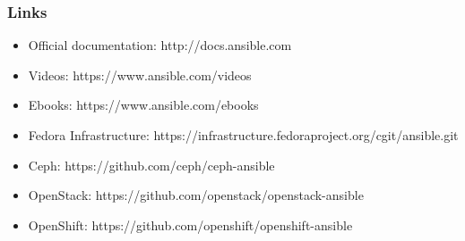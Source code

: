 \documentclass[t,aspectratio=169]{beamer}
\begin{document}
\begin{frame}
    \frametitle{Links}
    \begin{itemize}
        \item Official documentation: http://docs.ansible.com
        \item Videos: https://www.ansible.com/videos
        \item Ebooks: https://www.ansible.com/ebooks
        \item Fedora Infrastructure: https://infrastructure.fedoraproject.org/cgit/ansible.git
        \item Ceph: https://github.com/ceph/ceph-ansible
        \item OpenStack: https://github.com/openstack/openstack-ansible
        \item OpenShift: https://github.com/openshift/openshift-ansible
    \end{itemize}
\end{frame}

\end{document}
